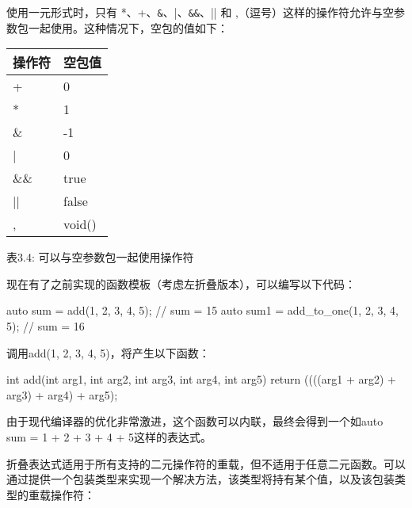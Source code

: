 使用一元形式时，只有 *、+、\verb|&|、|、\verb|&&|、|| 和 ,（逗号）这样的操作符允许与空参数包一起使用。这种情况下，空包的值如下：

\begin{longtable}{|l|l|}
\hline
\textbf{操作符} & \textbf{空包值} \\ \hline
\endfirsthead
%
\endhead
%
+                 & 0                         \\ \hline
*                 & 1                         \\ \hline
\&                & -1                        \\ \hline
|                 & 0                         \\ \hline
\&\&              & true                      \\ \hline
||                & false                     \\ \hline
,                 & void()                    \\ \hline
\end{longtable}

\begin{center}
表3.4: 可以与空参数包一起使用操作符
\end{center}

现在有了之前实现的函数模板（考虑左折叠版本），可以编写以下代码：

\begin{cpp}
auto sum = add(1, 2, 3, 4, 5);         // sum = 15
auto sum1 = add_to_one(1, 2, 3, 4, 5); // sum = 16
\end{cpp}

调用add(1, 2, 3, 4, 5)，将产生以下函数：

\begin{cpp}
int add(int arg1, int arg2, int arg3, int arg4, int arg5)
{
    return ((((arg1 + arg2) + arg3) + arg4) + arg5);
}
\end{cpp}

由于现代编译器的优化非常激进，这个函数可以内联，最终会得到一个如auto sum = 1 + 2 + 3 + 4 + 5这样的表达式。


折叠表达式适用于所有支持的二元操作符的重载，但不适用于任意二元函数。可以通过提供一个包装类型来实现一个解决方法，该类型将持有某个值，以及该包装类型的重载操作符：

